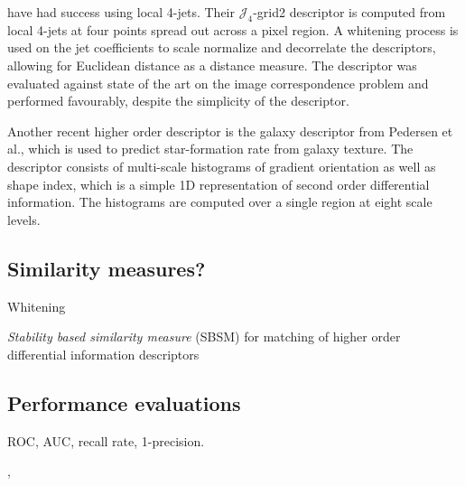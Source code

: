 \documentclass[../thesis.tex]{subfiles}
\begin{document}
\cite{larsen2012jet} have had success using local 4-jets. Their
$\mathcal{J}_4$-grid2 descriptor is computed from local 4-jets at four points
spread out across a pixel region. A whitening process is used on the jet
coefficients to scale normalize and decorrelate the descriptors, allowing for
Euclidean distance as a distance measure. The descriptor was evaluated against
state of the art on the image correspondence problem and performed favourably,
despite the simplicity of the descriptor.

Another recent higher order descriptor is the galaxy descriptor from Pedersen
et al.\cite{pedersen2013shape}, which is used to predict star-formation
rate from galaxy texture. The descriptor consists of multi-scale histograms
of gradient orientation as well as shape index, which is a simple 1D
representation of second order differential information. The histograms are
computed over a single region at eight scale levels.

\subsection{Similarity measures?}

Whitening

\emph{Stability based similarity measure} (SBSM) \cite{balmashnova2008novel} for
matching of higher order differential information descriptors

\subsection{Performance evaluations}

ROC, AUC, recall rate, 1-precision.

\cite{mikolajczyk2005performance},
\cite{dahl2011finding}

\subbibliography
\end{document}
